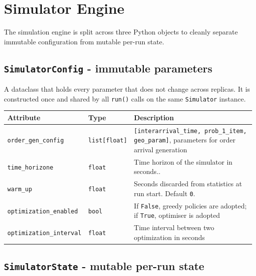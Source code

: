 \documentclass[a4paper,10pt]{article}
\begin{document}
\newpage \clearpage
\section{Simulator Engine}

The simulation engine is split across three Python objects to cleanly separate immutable configuration from mutable per-run state.

\subsection{\texttt{SimulatorConfig} - immutable parameters}

A dataclass that holds every parameter that does not change across replicas. It is constructed once and shared by all \texttt{run()} calls on the same \texttt{Simulator} instance.

\vspace{0.4em}
\begin{tabularx}{\textwidth}{l l X}
\toprule
\textbf{Attribute} & \textbf{Type} & \textbf{Description} \\
\midrule
\texttt{order\_gen\_config}    & \texttt{list[float]}  & \texttt{[interarrival\_time, prob\_1\_item, geo\_param]}, parameters for order arrival generation \\
\texttt{time\_horizone}        & \texttt{float}        & Time horizon of the simulator in seconds.. \\
\texttt{warm\_up}              & \texttt{float}        & Seconds discarded from statistics at run start. Default \texttt{0}. \\
\texttt{optimization\_enabled} & \texttt{bool}         & If \texttt{False}, greedy policies are adopted; if \texttt{True}, optimiser is adopted \\
\texttt{optimization\_interval} & \texttt{float}        & Time interval between two optimization in seconds \\
\bottomrule
\end{tabularx}

\subsection{\texttt{SimulatorState} - mutable per-run state}
\end{document}
